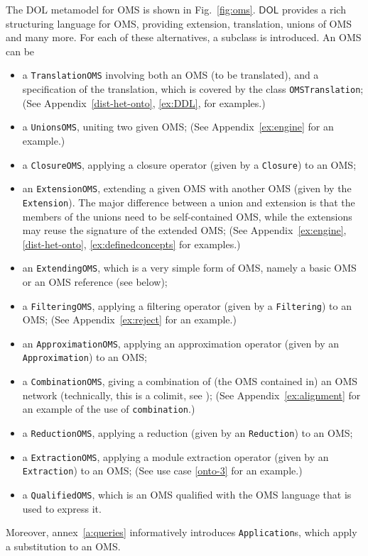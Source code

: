 \documentclass[10pt,fleqn,final]{scrreprt}
\newcommand*{\syntax}[1]{\texttt{#1}}
\newcommand*{\DOL}{\ensuremath{\mathsf{DOL}}\xspace}
\newenvironment{definitions}[0]{\medskip }{}
\begin{document}
\begin{definitions}
The DOL metamodel for OMS is shown in Fig.~\ref{fig:oms}.
\DOL provides a rich structuring language for OMS, providing
extension, translation, unions of OMS and many more.  For each of
these alternatives, a subclass is introduced. An OMS can be
\begin{itemize}
\item a \syntax{TranslationOMS} involving both
an OMS (to be translated), and a specification of the translation,
which is covered by the class \syntax{OMSTranslation}; 
(See Appendix~\ref{dist-het-onto}, \ref{ex:DDL}, for examples.)
\item a \syntax{UnionsOMS}, uniting two given OMS; 
(See Appendix~\ref{ex:engine} for an example.)
\item a \syntax{ClosureOMS}, applying a closure operator
(given by a \syntax{Closure}) to an OMS; 
\item an \syntax{ExtensionOMS}, extending a given OMS with another OMS
  (given by the \syntax{Extension}). The major difference between a
  union and extension is that the members of the unions need to be
  self-contained OMS, while the extensions may reuse the signature of
  the extended OMS; 
  (See Appendix~\ref{ex:engine}, \ref{dist-het-onto}, \ref{ex:definedconcepts} for examples.)
\item an \syntax{ExtendingOMS}, which is a very simple form of OMS,
namely a basic OMS or an OMS reference (see below);
\item a \syntax{FilteringOMS}, applying a filtering operator
(given by a \syntax{Filtering}) to an OMS;
  (See Appendix~\ref{ex:reject} for an example.)
\item an \syntax{ApproximationOMS}, applying an approximation operator
(given by an \syntax{Approximation}) to an OMS;
\item a \syntax{CombinationOMS}, giving a combination of (the OMS
  contained in) an OMS network (technically, this is a colimit, see
  \cite{ZimmermanEtAl06}); 
  (See Appendix~\ref{ex:alignment} for an example of the use of \syntax{combination}.)
\item a \syntax{ReductionOMS}, applying a reduction
(given by an \syntax{Reduction}) to an OMS;
\item a \syntax{ExtractionOMS}, applying a module extraction operator
(given by an \syntax{Extraction}) to an OMS;
 (See use case \ref{onto-3} for an example.)
\item a \syntax{QualifiedOMS}, which is an OMS qualified with the OMS
  language that is used to express it.
\end{itemize}
Moreover, annex~\ref{a:queries}
informatively introduces \syntax{Application}s, which apply a substitution
to an OMS.


\end{definitions}
\end{document}
